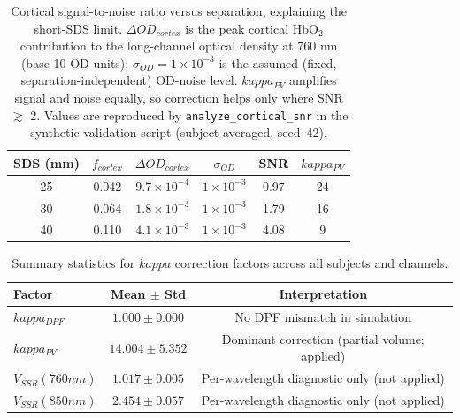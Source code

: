 \documentclass[11pt]{article}
\def\kappa{kappa}%
\def\mathrm#1{#1}%
\def\,{ }%
\begin{document}
\begin{table}[ht]
\centering
\caption{Cortical signal-to-noise ratio versus separation, explaining the short-SDS limit. $\Delta\mathrm{OD}_{\mathrm{cortex}}$ is the peak cortical HbO$_2$ contribution to the long-channel optical density at 760\,nm (base-10 OD units); $\sigma_{\mathrm{OD}} = 1\times10^{-3}$ is the assumed (fixed, separation-independent) OD-noise level. $\kappa_{\mathrm{PV}}$ amplifies signal and noise equally, so correction helps only where SNR\,$\gtrsim$\,2. Values are reproduced by \texttt{analyze\_cortical\_snr} in the synthetic-validation script (subject-averaged, seed~42).}
\label{tab:snr}
\begin{tabular}{@{}cccccc@{}}
\toprule
\textbf{SDS (mm)} & $f_{\mathrm{cortex}}$ & $\Delta\mathrm{OD}_{\mathrm{cortex}}$ & $\sigma_{\mathrm{OD}}$ & \textbf{SNR} & $\kappa_{\mathrm{PV}}$ \\
\midrule
25 & 0.042 & $9.7\times10^{-4}$ & $1\times10^{-3}$ & 0.97 & 24 \\
30 & 0.064 & $1.8\times10^{-3}$ & $1\times10^{-3}$ & 1.79 & 16 \\
40 & 0.110 & $4.1\times10^{-3}$ & $1\times10^{-3}$ & 4.08 & 9 \\
\bottomrule
\end{tabular}
\end{table}

\begin{table}[ht]
\centering
\caption{Summary statistics for $\kappa$ correction factors across all subjects and channels.}
\label{tab:kappa_stats}
\begin{tabular}{@{}lcc@{}}
\toprule
\textbf{Factor} & \textbf{Mean $\pm$ Std} & \textbf{Interpretation} \\
\midrule
$\kappa_{\mathrm{DPF}}$ & $1.000 \pm 0.000$ & No DPF mismatch in simulation \\
$\kappa_{\mathrm{PV}}$ & $14.004 \pm 5.352$ & Dominant correction (partial volume; applied) \\
$V_{\mathrm{SSR}}(760\,\mathrm{nm})$ & $1.017 \pm 0.005$ & Per-wavelength diagnostic only (not applied) \\
$V_{\mathrm{SSR}}(850\,\mathrm{nm})$ & $2.454 \pm 0.057$ & Per-wavelength diagnostic only (not applied) \\
\bottomrule
\end{tabular}
\end{table}
\end{document}
